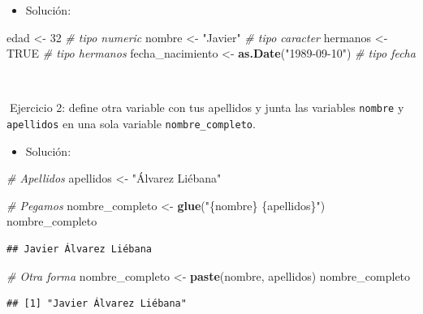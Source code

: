 \documentclass[11pt,]{book}
\newenvironment{Shaded}{\begin{snugshade}}{\end{snugshade}}
\newcommand{\CommentTok}[1]{\textcolor[rgb]{0.37,0.37,0.37}{\textit{#1}}}
\newcommand{\DecValTok}[1]{\textcolor[rgb]{0.06,0.06,0.06}{#1}}
\newcommand{\KeywordTok}[1]{\textcolor[rgb]{0.27,0.27,0.27}{\textbf{#1}}}
\newcommand{\NormalTok}[1]{#1}
\newcommand{\OtherTok}[1]{\textcolor[rgb]{0.37,0.37,0.37}{#1}}
\newcommand{\StringTok}[1]{\textcolor[rgb]{0.5,0.5,0.5}{#1}}
\providecommand{\tightlist}{%
  \setlength{\itemsep}{0pt}\setlength{\parskip}{0pt}}
\begin{document}
\begin{itemize}
\tightlist
\item
  Solución:
\end{itemize}

\begin{Shaded}
\begin{Highlighting}[]
\NormalTok{edad <-}\StringTok{ }\DecValTok{32} \CommentTok{# tipo numeric}
\NormalTok{nombre <-}\StringTok{ "Javier"} \CommentTok{# tipo caracter}
\NormalTok{hermanos <-}\StringTok{ }\OtherTok{TRUE} \CommentTok{# tipo hermanos}
\NormalTok{fecha_nacimiento <-}\StringTok{ }\KeywordTok{as.Date}\NormalTok{(}\StringTok{"1989-09-10"}\NormalTok{) }\CommentTok{# tipo fecha}
\end{Highlighting}
\end{Shaded}

~

📝Ejercicio 2: define otra variable con tus apellidos y junta las variables \texttt{nombre} y \texttt{apellidos} en una sola variable \texttt{nombre\_completo}.

\begin{itemize}
\tightlist
\item
  Solución:
\end{itemize}

\begin{Shaded}
\begin{Highlighting}[]
\CommentTok{# Apellidos}
\NormalTok{apellidos <-}\StringTok{ "Álvarez Liébana"}

\CommentTok{# Pegamos}
\NormalTok{nombre_completo <-}\StringTok{ }\KeywordTok{glue}\NormalTok{(}\StringTok{"\{nombre\} \{apellidos\}"}\NormalTok{)}
\NormalTok{nombre_completo}
\end{Highlighting}
\end{Shaded}

\begin{verbatim}
## Javier Álvarez Liébana
\end{verbatim}

\begin{Shaded}
\begin{Highlighting}[]
\CommentTok{# Otra forma}
\NormalTok{nombre_completo <-}\StringTok{ }\KeywordTok{paste}\NormalTok{(nombre, apellidos)}
\NormalTok{nombre_completo}
\end{Highlighting}
\end{Shaded}

\begin{verbatim}
## [1] "Javier Álvarez Liébana"
\end{verbatim}
\end{document}
